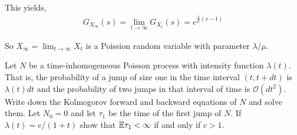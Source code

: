 \begin{solution}[Solution]
This yields,
\begin{align*}
    G_{X_\infty}(s) = \lim_{t\to\infty} G_{X_t}(s) = e^{\frac{\lambda}{\mu}(s-1)} 
\end{align*}

So \( X_\infty = \lim_{t\to\infty} X_t \) is a Poission random variable with parameter \( \lambda/\mu \).
\end{solution}

\begin{problem}[Exercise 5.4]
    Let \( N \) be a time-inhomogeneous Poisson process with intensity function \( \lambda(t) \). That is, the probability of a jump of size one in the time interval \( (t,t+ dt) \) is \( \lambda(t)dt \) and the probability of two jumps in that interval of time is \( \mathcal{O}(dt^2) \). Write down the Kolmogorov forward and backward equations of \( N \) and solve them. Let \( N_0 = 0 \) and let \( \tau_1 \) be the time of the first jump of \( N \). If \( \lambda(t) = c/(1 + t) \) show that \( \mathbb{E}\tau_1< \infty \) if and only if \( c >1 \).
\end{problem}

